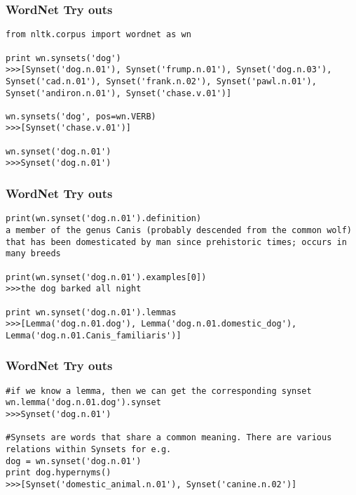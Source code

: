 \begin{frame}[fragile]
\frametitle{ WordNet Try outs}
\begin{lstlisting}
from nltk.corpus import wordnet as wn

print wn.synsets('dog')
>>>[Synset('dog.n.01'), Synset('frump.n.01'), Synset('dog.n.03'), Synset('cad.n.01'), Synset('frank.n.02'), Synset('pawl.n.01'), Synset('andiron.n.01'), Synset('chase.v.01')]

wn.synsets('dog', pos=wn.VERB)
>>>[Synset('chase.v.01')]

wn.synset('dog.n.01')
>>>Synset('dog.n.01')
\end{lstlisting}
\end{frame}

\begin{frame}[fragile]
\frametitle{ WordNet Try outs}
\begin{lstlisting}
print(wn.synset('dog.n.01').definition)
a member of the genus Canis (probably descended from the common wolf) that has been domesticated by man since prehistoric times; occurs in many breeds

print(wn.synset('dog.n.01').examples[0])
>>>the dog barked all night

print wn.synset('dog.n.01').lemmas
>>>[Lemma('dog.n.01.dog'), Lemma('dog.n.01.domestic_dog'), Lemma('dog.n.01.Canis_familiaris')]
\end{lstlisting}
\end{frame}

\begin{frame}[fragile]
\frametitle{ WordNet Try outs}
\begin{lstlisting}
#if we know a lemma, then we can get the corresponding synset
wn.lemma('dog.n.01.dog').synset
>>>Synset('dog.n.01')

#Synsets are words that share a common meaning. There are various relations within Synsets for e.g. 
dog = wn.synset('dog.n.01')
print dog.hypernyms()
>>>[Synset('domestic_animal.n.01'), Synset('canine.n.02')]
\end{lstlisting}
\end{frame}

